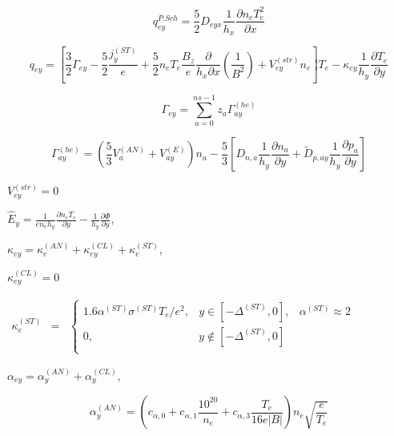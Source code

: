 \documentclass[a4paper,10pt]{report}
\begin{document}
\begin{equation*}
q_{ey}^{P.Sch} = \frac 5 2 D_{eyx} \frac 1{h_x} \frac{\partial n_e T_e^2}{\partial x}
\end{equation*}

\begin{equation*}
q_{ey} = \left[
	\frac 3 2 \Gamma_{ey} - \frac 5 2 \frac{j_y^{\left( ST \right)}} e +
	\frac 5 2 n_e T_e \frac{B_z}e \frac{\partial }{h_x \partial	x}\left( \frac 1{B^2} \right) +
	V_{ey}^{(str)} n_e
\right] T_e -
\kappa_{ey} \frac 1{h_y} \frac{\partial T_e}{\partial y}
\end{equation*}

\begin{equation*}
\Gamma_{ey} = \sum \limits_{a=0}^{ns-1} z_a \Gamma_{ay}^{(he)}
\end{equation*}

\begin{equation*}
\Gamma_{ay}^{(he)} = \left( \frac 5 3 V_a^{(AN)} + V_{ay}^{(E)} \right) n_a - \frac 5 3 \left[
	D_{n,a} \frac 1{h_y} \frac{\partial n_a}{\partial y} +
	\widetilde D_{p,ay} \frac 1{h_y} \frac{\partial	p_a}{\partial y}
\right]
\end{equation*}


$V_{ey}^{(str)} = 0$

$\hat E_y = \frac 1{e n_e h_y} \frac{\partial n_e T_e}{\partial y} - \frac 1{h_y}\frac{\partial \Phi }{\partial y}$,

$\kappa_{ey} = \kappa_e^{(AN)} + \kappa_{ey}^{(CL)} + \kappa_e^{(ST)}$,

$\kappa_{ey}^{(CL)} = 0$

$
\begin{matrix}
\kappa_{e}^{(ST)} & =
& \left\{
\begin{matrix}
1.6 \alpha^{(ST)} \sigma^{(ST)} T_e / e^2
, &  y \in \left[ -\Delta^{(ST)},0 \right], & \alpha^{(ST)} \approx  2 \\
0, &  y \notin \left[ -\Delta^{(ST)},0 \right]\\
\end{matrix} \right.
\end{matrix}
$

$\alpha_{ey} = \alpha^{(AN)}_{y} + \alpha^{(CL)}_{y}$,

\begin{equation*}
\alpha^{(AN)}_{y} = \left(
	c_{\alpha,0} + c_{\alpha,1} \frac{10^{20}}{n_e} +
	c_{\alpha,3} \frac{T_e}{16 e |B|}
\right) n_e \sqrt{\frac e{T_e}}
\end{equation*}
\end{document}

